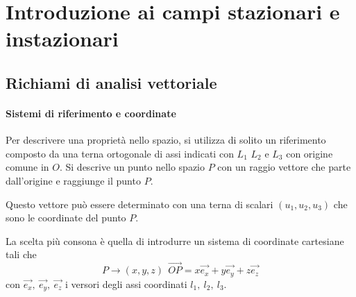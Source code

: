 
\section{Introduzione ai campi stazionari e instazionari}
\subsection{Richiami di analisi vettoriale}
\paragraph{Sistemi di riferimento e coordinate}
Per descrivere una proprietà nello spazio, si utilizza di solito un riferimento composto da 
una terna ortogonale di assi indicati con $L_1$ $L_2$ e $L_3$ con origine comune in $O$.
Si descrive un punto nello spazio $P$ con un raggio vettore che parte dall'origine e 
raggiunge il punto $P$.

\begin{figure}[H] %
\centering
{}
\end{figure}

Questo vettore può essere determinato con una terna di scalari $(u_1,u_2,u_3)$ che sono le 
coordinate del punto $P$.

La scelta più consona è quella di introdurre un sistema di coordinate cartesiane tali che 
$$
P \rightarrow (x,y,z)\ \ \vec{OP} = x\vec{e_x} + y\vec{e_y} + z\vec{e_z}
$$
con $\vec{e_x},\ \vec{e_y},\ \vec{e_z}$ i versori degli assi coordinati $l_1,\ l_2,\ l_3$.

